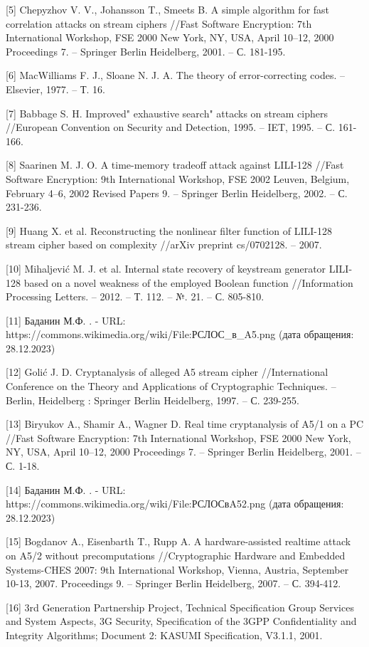 \documentclass[colorthm]{./civarticle}
\begin{document}
[5] Chepyzhov V. V., Johansson T., Smeets B. A simple algorithm for fast correlation attacks on stream ciphers //Fast Software Encryption: 7th International Workshop, FSE 2000 New York, NY, USA, April 10–12, 2000 Proceedings 7. – Springer Berlin Heidelberg, 2001. – С. 181-195.

[6] MacWilliams F. J., Sloane N. J. A. The theory of error-correcting codes. – Elsevier, 1977. – Т. 16.

[7] Babbage S. H. Improved" exhaustive search" attacks on stream ciphers //European Convention on Security and Detection, 1995. – IET, 1995. – С. 161-166.

[8] Saarinen M. J. O. A time-memory tradeoff attack against LILI-128 //Fast Software Encryption: 9th International Workshop, FSE 2002 Leuven, Belgium, February 4–6, 2002 Revised Papers 9. – Springer Berlin Heidelberg, 2002. – С. 231-236.

[9] Huang X. et al. Reconstructing the nonlinear filter function of LILI-128 stream cipher based on complexity //arXiv preprint cs/0702128. – 2007.

[10] Mihaljević M. J. et al. Internal state recovery of keystream generator LILI-128 based on a novel weakness of the employed Boolean function //Information Processing Letters. – 2012. – Т. 112. – №. 21. – С. 805-810.

[11] Баданин М.Ф. . - URL: https://commons.wikimedia.org/wiki/File:РСЛОС\_в\_A5.png (дата обращения: 28.12.2023)

[12] Golić J. D. Cryptanalysis of alleged A5 stream cipher //International Conference on the Theory and Applications of Cryptographic Techniques. – Berlin, Heidelberg : Springer Berlin Heidelberg, 1997. – С. 239-255.

[13] Biryukov A., Shamir A., Wagner D. Real time cryptanalysis of A5/1 on a PC //Fast Software Encryption: 7th International Workshop, FSE 2000 New York, NY, USA, April 10–12, 2000 Proceedings 7. – Springer Berlin Heidelberg, 2001. – С. 1-18.

[14] Баданин М.Ф. . - URL: https://commons.wikimedia.org/wiki/File:РСЛОСвA52.png (дата обращения: 28.12.2023) 

[15] Bogdanov A., Eisenbarth T., Rupp A. A hardware-assisted realtime attack on A5/2 without precomputations //Cryptographic Hardware and Embedded Systems-CHES 2007: 9th International Workshop, Vienna, Austria, September 10-13, 2007. Proceedings 9. – Springer Berlin Heidelberg, 2007. – С. 394-412.

[16] 3rd Generation Partnership Project, Technical Specification Group Services and
System Aspects, 3G Security, Specification of the 3GPP Confidentiality and Integrity Algorithms; Document 2: KASUMI Specification, V3.1.1, 2001.
\end{document}
